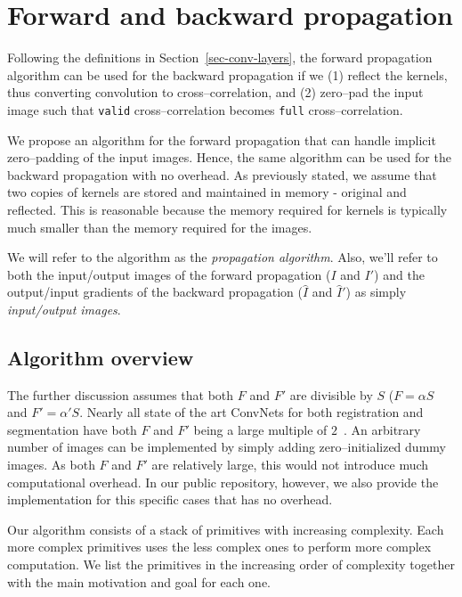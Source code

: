 \section{Forward and backward propagation}

  Following the definitions in Section~\ref{sec-conv-layers}, the
  forward propagation algorithm can be used for the backward
  propagation if we (1) reflect the kernels, thus converting
  convolution to cross--correlation, and (2) zero--pad the input image
  such that \texttt{valid} cross--correlation becomes \texttt{full}
  cross--correlation.

  We propose an algorithm for the forward propagation that can handle
  implicit zero--padding of the input images.  Hence, the same
  algorithm can be used for the backward propagation with no overhead.
  As previously stated, we assume that two copies of kernels are
  stored and maintained in memory - original and reflected.  This is
  reasonable because the memory required for kernels is typically much
  smaller than the memory required for the images.

  We will refer to the algorithm as the \emph{propagation algorithm}.
  Also, we'll refer to both the input/output images of the forward
  propagation ($I$ and $I'$) and the output/input gradients of the
  backward propagation ($\hat{I}$ and $\hat{I}'$) as simply
  \emph{input/output images}.

  \subsection{Algorithm overview}

  The further discussion assumes that both $F$ and $F'$ are divisible
  by $S$ ($F = \alpha S$ and $F' = \alpha' S$.  Nearly all state of
  the art ConvNets for both registration and segmentation have both
  $F$ and $F'$ being a large multiple of
  $2$~\cite{krizhevsky2012imagenet, ronneberger2015u,
    simonyan2014very, sermanet2013overfeat, long2015fully,
    tran2015learning, ji20133d, maturana_iros_2015,
    maturana_icra_2014}.  An arbitrary number of images can be
  implemented by simply adding zero--initialized dummy images.  As
  both $F$ and $F'$ are relatively large, this would not introduce
  much computational overhead.  In our public repository, however, we
  also provide the implementation for this specific cases that has no
  overhead.

  Our algorithm consists of a stack of primitives with increasing
  complexity.  Each more complex primitives uses the less complex ones
  to perform more complex computation.  We list the primitives in the
  increasing order of complexity together with the main motivation and
  goal for each one.


